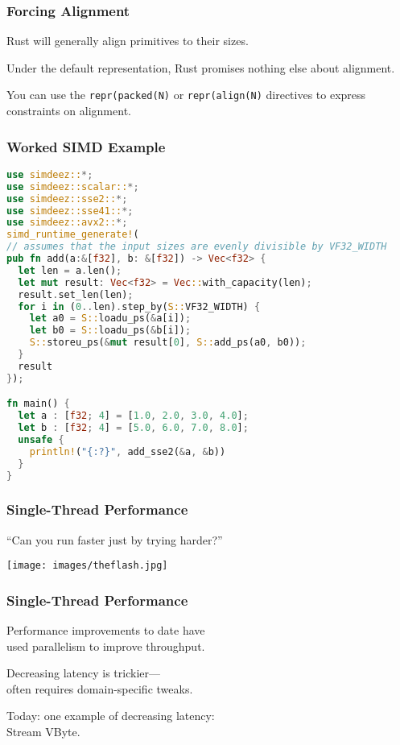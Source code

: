 \begin{frame}
\frametitle{Forcing Alignment}

Rust will generally align primitives to their sizes. 

Under the default representation, Rust promises nothing else about alignment.

You can use the \texttt{repr(packed(N)} or \texttt{repr(align(N)} directives to express constraints on alignment.


\end{frame}


\begin{frame}[fragile]
\frametitle{Worked SIMD Example}

\begin{lstlisting}[language=Rust]
use simdeez::*;
use simdeez::scalar::*;
use simdeez::sse2::*;
use simdeez::sse41::*;
use simdeez::avx2::*;
simd_runtime_generate!(
// assumes that the input sizes are evenly divisible by VF32_WIDTH
pub fn add(a:&[f32], b: &[f32]) -> Vec<f32> {
  let len = a.len();
  let mut result: Vec<f32> = Vec::with_capacity(len);
  result.set_len(len);
  for i in (0..len).step_by(S::VF32_WIDTH) {
    let a0 = S::loadu_ps(&a[i]);
    let b0 = S::loadu_ps(&b[i]);
    S::storeu_ps(&mut result[0], S::add_ps(a0, b0));
  }
  result
});

fn main() {
  let a : [f32; 4] = [1.0, 2.0, 3.0, 4.0];
  let b : [f32; 4] = [5.0, 6.0, 7.0, 8.0];
  unsafe {
    println!("{:?}", add_sse2(&a, &b))
  }
}
\end{lstlisting}



\end{frame}



\begin{frame}
\frametitle{Single-Thread Performance}

``Can you run faster just by trying harder?''

\begin{center}
\texttt{[image: images/theflash.jpg]}
\end{center}

\end{frame}


\begin{frame}
\frametitle{Single-Thread Performance}


Performance improvements to date have \\
used parallelism
to improve throughput. 

Decreasing latency is trickier---\\
often requires domain-specific
tweaks. 

Today: one example of decreasing latency: \\
\hspace*{2em} Stream VByte.


\end{frame}


